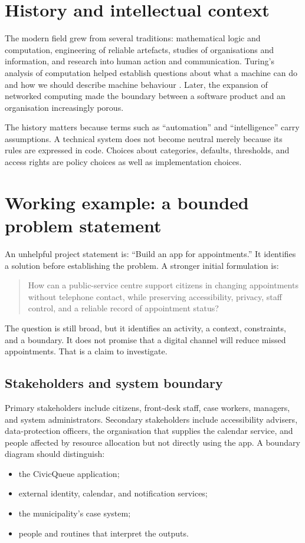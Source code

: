 \section{History and intellectual context}
The modern field grew from several traditions: mathematical logic and computation, engineering of reliable artefacts, studies of organisations and information, and research into human action and communication. Turing's analysis of computation helped establish questions about what a machine can do and how we should describe machine behaviour \citep{turing1950computing}. Later, the expansion of networked computing made the boundary between a software product and an organisation increasingly porous.

The history matters because terms such as ``automation'' and ``intelligence'' carry assumptions. A technical system does not become neutral merely because its rules are expressed in code. Choices about categories, defaults, thresholds, and access rights are policy choices as well as implementation choices.

\section{Working example: a bounded problem statement}
An unhelpful project statement is: ``Build an app for appointments.'' It identifies a solution before establishing the problem. A stronger initial formulation is:

\begin{quote}
How can a public-service centre support citizens in changing appointments without telephone contact, while preserving accessibility, privacy, staff control, and a reliable record of appointment status?
\end{quote}

The question is still broad, but it identifies an activity, a context, constraints, and a boundary. It does not promise that a digital channel will reduce missed appointments. That is a claim to investigate.

\subsection{Stakeholders and system boundary}
Primary stakeholders include citizens, front-desk staff, case workers, managers, and system administrators. Secondary stakeholders include accessibility advisers, data-protection officers, the organisation that supplies the calendar service, and people affected by resource allocation but not directly using the app. A boundary diagram should distinguish:
\begin{itemize}
\item the CivicQueue application;
\item external identity, calendar, and notification services;
\item the municipality's case system;
\item people and routines that interpret the outputs.
\end{itemize}

